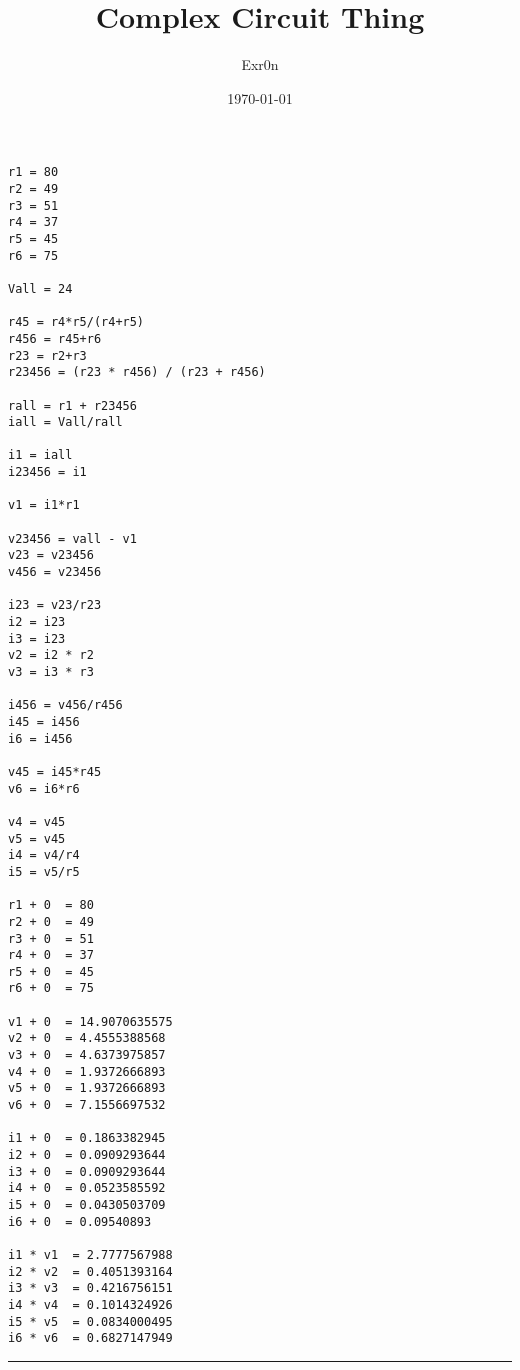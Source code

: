\documentclass[letterpaper]{article}
\author{Exr0n}
\date{\today}
\title{Complex Circuit Thing}
\renewcommand\maketitle{}
\begin{document}
\maketitle
\begin{verbatim}
r1 = 80
r2 = 49
r3 = 51
r4 = 37
r5 = 45
r6 = 75

Vall = 24

r45 = r4*r5/(r4+r5)
r456 = r45+r6
r23 = r2+r3
r23456 = (r23 * r456) / (r23 + r456)

rall = r1 + r23456
iall = Vall/rall

i1 = iall
i23456 = i1

v1 = i1*r1

v23456 = vall - v1
v23 = v23456
v456 = v23456

i23 = v23/r23
i2 = i23
i3 = i23
v2 = i2 * r2
v3 = i3 * r3

i456 = v456/r456
i45 = i456
i6 = i456

v45 = i45*r45
v6 = i6*r6

v4 = v45
v5 = v45
i4 = v4/r4
i5 = v5/r5

r1 + 0  = 80
r2 + 0  = 49
r3 + 0  = 51
r4 + 0  = 37
r5 + 0  = 45
r6 + 0  = 75

v1 + 0  = 14.9070635575
v2 + 0  = 4.4555388568
v3 + 0  = 4.6373975857
v4 + 0  = 1.9372666893
v5 + 0  = 1.9372666893
v6 + 0  = 7.1556697532

i1 + 0  = 0.1863382945
i2 + 0  = 0.0909293644
i3 + 0  = 0.0909293644
i4 + 0  = 0.0523585592
i5 + 0  = 0.0430503709
i6 + 0  = 0.09540893

i1 * v1  = 2.7777567988
i2 * v2  = 0.4051393164
i3 * v3  = 0.4216756151
i4 * v4  = 0.1014324926
i5 * v5  = 0.0834000495
i6 * v6  = 0.6827147949
\end{verbatim}

\noindent\rule{\textwidth}{0.5pt}
\end{document}
